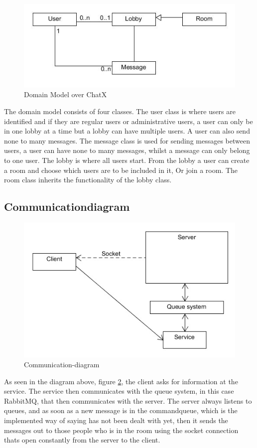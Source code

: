 \begin{figure}[H]
\centering
\includegraphics[width=0.7\linewidth]{img/DomainModelChatX}
\caption{Domain Model over ChatX}
\label{fig:DomainModelChatX}
\end{figure}

The domain model consists of four classes. The user class is where users are identified and if they are regular users or administrative users, a user can only be in one lobby at a time but a lobby can have multiple users. A user can also send none to many messages. The message class is used for sending messages between users, a user can have none to many messages, whilst a message can only belong to one user. The lobby is where all users start. From the lobby a user can create a room and choose which users are to be included in it, Or join a room. The room class inherits the functionality of the lobby class.

\subsection{Communicationdiagram}

\begin{figure}[h]
\centering
\includegraphics[width=0.7\linewidth]{img/Communicationdiagram}
\caption[Communication-diagram]{Communication-diagram}
\label{fig:Communicationdiagram}
\end{figure}

As seen in the diagram above, figure \ref{fig:Communicationdiagram}, the client asks for information at the service. The service then communicates with the queue system, in this case RabbitMQ, that then communicates with the server. The server always listens to queues, and as soon as a new message is in the commandqueue, which is the implemented way of saying has not been dealt with yet, then it sends the messages out to those people who is in the room using the socket connection thats open constantly from the server to the client.
